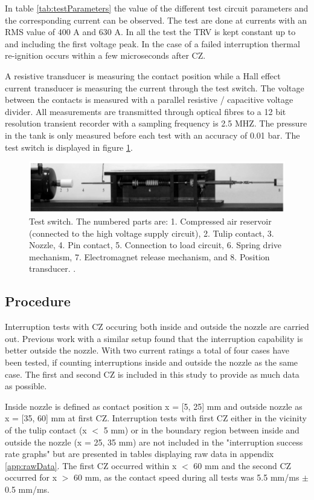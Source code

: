 \documentclass[10pt,a4paper,twoside]{article}
\begin{document}
In table \ref{tab:testParameters} the value of the different test circuit parameters and the corresponding current can be observed. The test are done at currents with an RMS value of 400 A and 630 A. In all the test the TRV is kept constant up to and including the first voltage peak. In the case of a failed interruption thermal re-ignition occurs within a few microseconds after CZ.

A resistive transducer is measuring the contact position while a Hall effect current transducer is measuring the current through the test switch. The voltage between the contacts is measured with a parallel resistive / capacitive voltage divider. All measurements are transmitted through optical fibres to a 12 bit resolution transient recorder with a sampling frequency is 2.5 MHZ. The pressure in the tank is only measured before each test with an accuracy of 0.01 bar. The test switch is displayed in figure \ref{fig:testSwitchRiggEq}.

\begin{figure} [H]
\centering
\includegraphics[scale=0.5]{Bilder/Method/switchTest.png}
\caption{Test switch. The numbered parts are: 1. Compressed air reservoir (connected to the high voltage supply circuit), 2. Tulip contact, 3. Nozzle, 4. Pin
contact, 5. Connection to load circuit, 6. Spring drive mechanism, 7. Electromagnet release mechanism, and 8. Position transducer. \cite{bib:AFIMVLBA}.} \label{fig:testSwitchRiggEq}
\end{figure}

\subsection{Procedure} \label{sec:procedure}
Interruption tests with CZ occuring both inside and outside the nozzle are carried out. Previous work with a similar setup found that the interruption capability is better outside the nozzle. With two current ratings a total of four cases have been tested, if counting interruptions inside and outside the nozzle as the same case. The first and second CZ is included in this study to provide as much data as possible.

Inside nozzle is defined as contact position x = [5, 25] mm and outside nozzle as x = [35, 60] mm at first CZ. Interruption tests with first CZ either in the vicinity of the tulip contact (x $<$ 5 mm) or in the boundary region between inside and outside the nozzle (x = 25, 35 mm) are not included in the "interruption success rate graphs" but are presented in tables displaying raw data in appendix \ref{app:rawData}. The first CZ occurred within x $<$ 60 mm and the second CZ occurred for x $>$ 60 mm, as the contact speed during all tests was 5.5 mm/ms $\pm$ 0.5 mm/ms.
\end{document}
